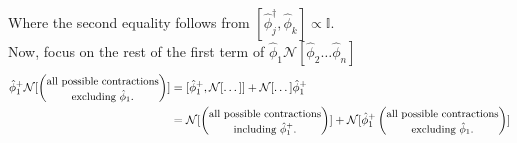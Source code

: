 \noindent Where the second equality follows from $[\hat{\phi}_j^\dagger, \hat{\phi}_k] \propto \mathbb{I}$. \\
\noindent Now, focus on the rest of the first term of $\hat{\phi}_1 \mathcal{N}[\hat{\phi}_2 \dots \hat{\phi}_n]$
\begin{align*}
\hat{\phi}_1^+ \mathcal{N}[ \left(\text{\stackanchor{{\small all possible contractions}}{{\small excluding $\hat{\phi}_1$.}}}\right) ] &= [ \hat{\phi}_1^+, \mathcal{N}[\dots]] + \mathcal{N}[\dots]\hat{\phi}_1^+ \\
&= \mathcal{N}[  \left(\text{\stackanchor{{\small all possible contractions}}{{\small including $\hat{\phi}_1^+$.}}}\right) ] + \mathcal{N}[\hat{\phi}_1^+ \left(\text{\stackanchor{{\small all possible contractions}}{{\small excluding $\hat{\phi}_1$.}}}\right)]
\end{align*}
